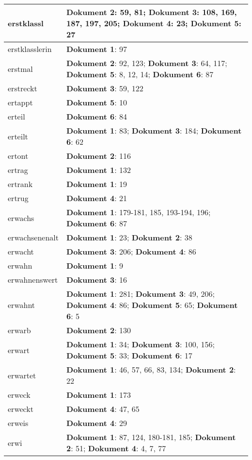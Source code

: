 \documentclass[a5paper]{article}
\begin{document}
\begin{longtable}[l]{|l|p{3in}|}
\hline
erstklassl & \textbf{Dokument 2}: 59, 81; \textbf{Dokument 3}: 108, 169, 187, 197, 205; \textbf{Dokument 4}: 23; \textbf{Dokument 5}: 27 \\
\hline
erstklasslerin & \textbf{Dokument 1}: 97 \\
\hline
erstmal & \textbf{Dokument 2}: 92, 123; \textbf{Dokument 3}: 64, 117; \textbf{Dokument 5}: 8, 12, 14; \textbf{Dokument 6}: 87 \\
\hline
erstreckt & \textbf{Dokument 3}: 59, 122 \\
\hline
ertappt & \textbf{Dokument 5}: 10 \\
\hline
erteil & \textbf{Dokument 6}: 84 \\
\hline
erteilt & \textbf{Dokument 1}: 83; \textbf{Dokument 3}: 184; \textbf{Dokument 6}: 62 \\
\hline
ertont & \textbf{Dokument 2}: 116 \\
\hline
ertrag & \textbf{Dokument 1}: 132 \\
\hline
ertrank & \textbf{Dokument 1}: 19 \\
\hline
ertrug & \textbf{Dokument 4}: 21 \\
\hline
erwachs & \textbf{Dokument 1}: 179-181, 185, 193-194, 196; \textbf{Dokument 6}: 87 \\
\hline
erwachsenenalt & \textbf{Dokument 1}: 23; \textbf{Dokument 2}: 38 \\
\hline
erwacht & \textbf{Dokument 3}: 206; \textbf{Dokument 4}: 86 \\
\hline
erwahn & \textbf{Dokument 1}: 9 \\
\hline
erwahnenswert & \textbf{Dokument 3}: 16 \\
\hline
erwahnt & \textbf{Dokument 1}: 281; \textbf{Dokument 3}: 49, 206; \textbf{Dokument 4}: 86; \textbf{Dokument 5}: 65; \textbf{Dokument 6}: 5 \\
\hline
erwarb & \textbf{Dokument 2}: 130 \\
\hline
erwart & \textbf{Dokument 1}: 34; \textbf{Dokument 3}: 100, 156; \textbf{Dokument 5}: 33; \textbf{Dokument 6}: 17 \\
\hline
erwartet & \textbf{Dokument 1}: 46, 57, 66, 83, 134; \textbf{Dokument 2}: 22 \\
\hline
erweck & \textbf{Dokument 1}: 173 \\
\hline
erweckt & \textbf{Dokument 4}: 47, 65 \\
\hline
erweis & \textbf{Dokument 4}: 29 \\
\hline
erwi & \textbf{Dokument 1}: 87, 124, 180-181, 185; \textbf{Dokument 2}: 51; \textbf{Dokument 4}: 4, 7, 77 \\

\end{longtable}
\end{document}
